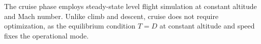 The cruise phase employs steady-state level flight simulation at constant altitude and Mach number. Unlike climb and descent, cruise does not require optimization, as the equilibrium condition $T = D$ at constant altitude and speed fixes the operational mode.

